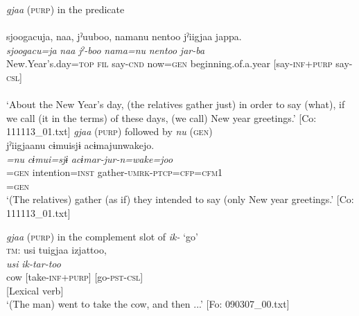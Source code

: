 \ea \label{ex:4.34}
  \ea \textit{gjaa} (\textsc{purp}) in the predicate \label{ex:4.34a}\\\\
\gllll 
    {\textbar}sjoogacu{\textbar}ja,  naa,  jˀuuboo,  namanu  {\textbar}nentoo{\textbar}   jˀiigjaa  jappa.\\
      \textit{sjoogacu=ja}  \textit{naa}  \textit{jˀ-boo}  \textit{nama=nu}  \textit{nentoo}   \textit{}  \textit{jar-ba}\\                                                                                               
      New.Year’s.day=\textsc{top}  \textsc{fil}  say-\textsc{cnd}  now=\textsc{gen}  beginning.of.a.year                           [say-\textsc{inf}+\textsc{purp}  say-\textsc{csl}]\\
                                                                                               [Nominal predicate]\\
      \glt ‘About the New Year’s day, (the relatives gather just) in order to say (what), if we call (it in the terms) of these days, (we call) New year greetings.’ [Co: 111113\_01.txt]
\ex  \textit{gjaa} (\textsc{purp}) followed by \textit{nu} (\textsc{gen})\\\label{ex:4.34b}
\gllll    jˀiigjaanu  cɨmuisjɨ  acɨmajunwakejo.\\
      \textit{=nu}  \textit{cɨmui=sjɨ}  \textit{acɨmar-jur-n=wake=joo}\\
      [say-\textsc{inf}+\textsc{purp}]=\textsc{gen}  intention=\textsc{inst}  gather-\textsc{umrk}-\textsc{ptcp}=\textsc{cfp}=\textsc{cfm}1\\
      [NP]=\textsc{gen}    \\
      \glt       ‘(The relatives) gather (as if) they intended to say (only New year greetings.’ [Co: 111113\_01.txt]

\ex \textit{gjaa} (\textsc{purp}) in the complement slot of \textit{ik-} ‘go’\\\label{ex:4.34c}
\gllll    \textsc{tm}:  usi  tuigjaa  izjattoo,\\
      \textit{usi}  \textit{}  \textit{ik-tar-too}\\
      cow  [take-\textsc{inf}+\textsc{purp}]  [go-\textsc{pst}-\textsc{csl}]\\
        [Complement]  [Lexical verb]\\
      \glt       ‘(The man) went to take the cow, and then ...’ [Fo: 090307\_00.txt]

